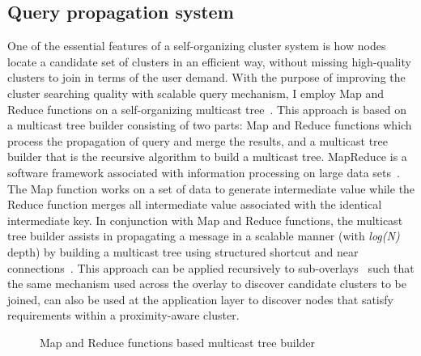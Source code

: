 \subsection{Query propagation system}
\label{solare:query}
One of the essential features of a self-organizing cluster system is how
nodes locate a candidate set of clusters in an efficient way, without
missing high-quality clusters to join in terms of the user demand.
%
With the purpose of improving the cluster searching quality with
scalable query mechanism, I employ Map and Reduce functions on a
self-organizing multicast tree~\cite{lee}.
%
This approach is based on a multicast tree builder consisting of two
parts: Map and Reduce functions which process the propagation of query
and merge the results, and a multicast tree builder that is the
recursive algorithm to build a multicast tree.
%
MapReduce is a software framework associated with information processing
on large data sets~\cite{mapreduce}.
%
The Map function works on a set of data to generate intermediate value
while the Reduce function merges all intermediate value associated with
the identical intermediate key.
%
In conjunction with Map and Reduce functions, the multicast tree
builder assists in propagating a message in a scalable manner (with
\textit{log(N)} depth) by building a multicast tree using structured
shortcut and near connections~\cite{deetoo}.
%
This approach can be applied recursively to
sub-overlays~\cite{bootstrap} such that the
same mechanism used across the overlay to discover candidate clusters to
be joined, can also be used at the application layer to discover nodes
that satisfy requirements within a proximity-aware cluster.\\
%
\begin{figure}
\centering
{}
\caption{Map and Reduce functions based multicast tree builder}
\label{fig:treebuild}
\end{figure}
